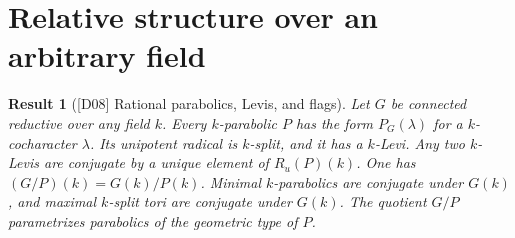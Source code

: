 \documentclass[11pt,a4paper,openany,oneside]{book}
\theoremstyle{resultstyle}
\newtheorem{statement}{Result}[chapter]
\newenvironment{result}[2]{\clubpenalty=10000\begin{statement}[\textnormal{[#1]} #2]\leavevmode\label{res:#1}\ignorespaces}{\end{statement}}
\theoremstyle{definition}
\numberwithin{equation}{chapter}
\begin{document}
\section{Relative structure over an arbitrary field}

\begin{result}{D08}{Rational parabolics, Levis, and flags}
Let \(G\) be connected reductive over any field \(k\). Every \(k\)-parabolic \(P\) has the form \(P_G(\lambda)\) for a \(k\)-cocharacter \(\lambda\). Its unipotent radical is \(k\)-split, and it has a \(k\)-Levi. Any two \(k\)-Levis are conjugate by a unique element of \(R_u(P)(k)\). One has \((G/P)(k)=G(k)/P(k)\). Minimal \(k\)-parabolics are conjugate under \(G(k)\), and maximal \(k\)-split tori are conjugate under \(G(k)\). The quotient \(G/P\) parametrizes parabolics of the geometric type of \(P\).
\end{result}
\end{document}
